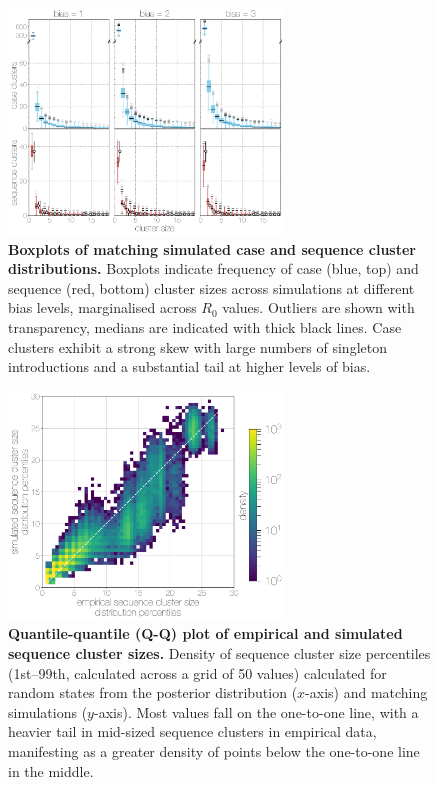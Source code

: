\documentclass[9pt,lineno]{elife}
\begin{document}
\begin{figure}[h]
\centering
	\includegraphics[width=0.65\textwidth]{figures/mers_distributions.png}
	\caption{\textbf{Boxplots of matching simulated case and sequence cluster distributions.}
Boxplots indicate frequency of case (blue, top) and sequence (red, bottom) cluster sizes across simulations at different bias levels, marginalised across $R_{0}$ values.
Outliers are shown with transparency, medians are indicated with thick black lines.
Case clusters exhibit a strong skew with large numbers of singleton introductions and a substantial tail at higher levels of bias.
	}
	\label{cluster_distributions}
\end{figure}

\begin{figure}[h]
\centering
	\includegraphics[width=0.65\textwidth]{figures/mers_qq.png}
	\caption{\textbf{Quantile-quantile (Q-Q) plot of empirical and simulated sequence cluster sizes.}
Density of sequence cluster size percentiles (1st--99th, calculated across a grid of 50 values) calculated for random states from the posterior distribution ($x$-axis) and matching simulations ($y$-axis).
Most values fall on the one-to-one line, with a heavier tail in mid-sized sequence clusters in empirical data, manifesting as a greater density of points below the one-to-one line in the middle.
	}
	\label{qq}
\end{figure}
\end{document}

